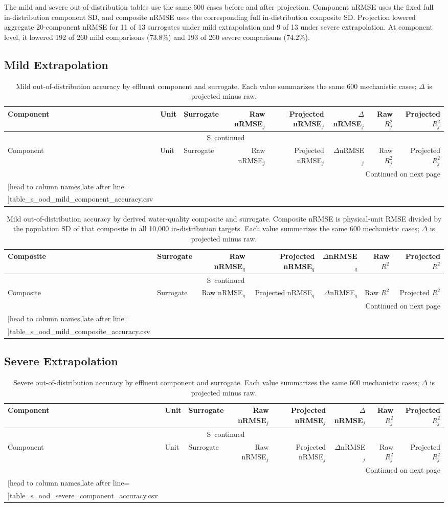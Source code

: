 \documentclass[a4paper,10pt]{article}
\newcommand{\csvrowsseven}[1]{%
  \csvreader[head to column names,late after line=\\]{#1}{}{\colA & \colB & \colC & \colD & \colE & \colF & \colG}}
\newcommand{\csvrowseight}[1]{%
  \csvreader[head to column names,late after line=\\]{#1}{}{\colA & \colB & \colC & \colD & \colE & \colF & \colG & \colH}}
\newcommand{\csvlongtable}[7]{%
  \begin{longtable}{#1}
  \caption{#2}\label{#3}\\
  \toprule
  #5 \\
  \midrule
  \endfirsthead
  \multicolumn{#4}{c}{\tablename\ \thetable\ continued}\\
  \toprule
  #5 \\
  \midrule
  \endhead
  \midrule\multicolumn{#4}{r}{Continued on next page}\\
  \endfoot
  \bottomrule
  \endlastfoot
  #7{#6}
  \end{longtable}%
}
\renewcommand{\thetable}{S\arabic{table}}
\begin{document}
The mild and severe out-of-distribution tables use the same 600 cases before and after projection. Component nRMSE uses the fixed full in-distribution component SD, and composite nRMSE uses the corresponding full in-distribution composite SD. Projection lowered aggregate 20-component nRMSE for 11 of 13 surrogates under mild extrapolation and 9 of 13 under severe extrapolation. At component level, it lowered 192 of 260 mild comparisons (73.8\%) and 193 of 260 severe comparisons (74.2\%).

\subsection{Mild Extrapolation}

\begingroup
\scriptsize
\setlength{\tabcolsep}{2.2pt}
\csvlongtable
  {llp{3.1cm}rrrrr}
  {Mild out-of-distribution accuracy by effluent component and surrogate. Each value summarizes the same 600 mechanistic cases; $\Delta$ is projected minus raw.}
  {tab:s_ood_mild_component_accuracy}
  {8}
  {Component & Unit & Surrogate & Raw nRMSE$_j$ & Projected nRMSE$_j$ & $\Delta$nRMSE$_j$ & Raw $R^2_j$ & Projected $R^2_j$}
  {table_s_ood_mild_component_accuracy.csv}
  {\csvrowseight}
\endgroup

\clearpage
\begingroup
\scriptsize
\setlength{\tabcolsep}{3pt}
\csvlongtable
  {lp{3.1cm}rrrrr}
  {Mild out-of-distribution accuracy by derived water-quality composite and surrogate. Composite nRMSE is physical-unit RMSE divided by the population SD of that composite in all 10,000 in-distribution targets. Each value summarizes the same 600 mechanistic cases; $\Delta$ is projected minus raw.}
  {tab:s_ood_mild_composite_accuracy}
  {7}
  {Composite & Surrogate & Raw nRMSE$_q$ & Projected nRMSE$_q$ & $\Delta$nRMSE$_q$ & Raw $R^2$ & Projected $R^2$}
  {table_s_ood_mild_composite_accuracy.csv}
  {\csvrowsseven}
\endgroup

\subsection{Severe Extrapolation}

\begingroup
\scriptsize
\setlength{\tabcolsep}{2.2pt}
\csvlongtable
  {llp{3.1cm}rrrrr}
  {Severe out-of-distribution accuracy by effluent component and surrogate. Each value summarizes the same 600 mechanistic cases; $\Delta$ is projected minus raw.}
  {tab:s_ood_severe_component_accuracy}
  {8}
  {Component & Unit & Surrogate & Raw nRMSE$_j$ & Projected nRMSE$_j$ & $\Delta$nRMSE$_j$ & Raw $R^2_j$ & Projected $R^2_j$}
  {table_s_ood_severe_component_accuracy.csv}
  {\csvrowseight}
\endgroup
\end{document}
